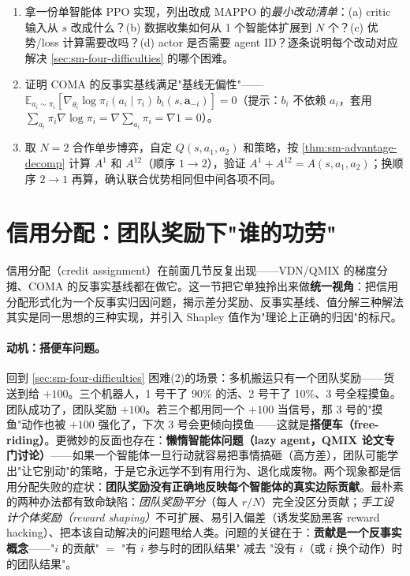 \begin{practice}
\begin{enumerate}
  \item 拿一份单智能体 PPO 实现，列出改成 MAPPO 的\emph{最小改动清单}：(a) critic 输入从 $s$ 改成什么？(b) 数据收集如何从 1 个智能体扩展到 $N$ 个？(c) 优势/loss 计算需要改吗？(d) actor 是否需要 agent ID？逐条说明每个改动对应解决 \cref{sec:sm-four-difficulties} 的哪个困难。
  \item 证明 COMA 的反事实基线满足"基线无偏性"——$\mathbb{E}_{a_i\sim\pi_i}[\nabla_{\theta_i}\log\pi_i(a_i\mid\tau_i)\,b_i(s,\mathbf{a}_{-i})]=0$（提示：$b_i$ 不依赖 $a_i$，套用 $\sum_{a_i}\pi_i\nabla\log\pi_i=\nabla\sum_{a_i}\pi_i=\nabla 1=0$）。
  \item 取 $N=2$ 合作单步博弈，自定 $Q(s,a_1,a_2)$ 和策略，按 \cref{thm:sm-advantage-decomp} 计算 $A^1$ 和 $A^{12}$（顺序 $1\to2$），验证 $A^1+A^{12}=A(s,a_1,a_2)$；换顺序 $2\to1$ 再算，确认联合优势相同但中间各项不同。
\end{enumerate}
\end{practice}

\section{信用分配：团队奖励下"谁的功劳"}
\label{sec:sm-credit}

信用分配（credit assignment）在前面几节反复出现——VDN/QMIX 的梯度分摊、COMA 的反事实基线都在做它。这一节把它单独拎出来做\textbf{统一视角}：把信用分配形式化为一个反事实归因问题，揭示差分奖励、反事实基线、值分解三种解法其实是同一思想的三种实现，并引入 Shapley 值作为"理论上正确的归因"的标尺。

\paragraph{动机：搭便车问题。}
回到 \cref{sec:sm-four-difficulties} 困难(2)的场景：多机搬运只有一个团队奖励——货送到给 $+100$。三个机器人，1 号干了 90\% 的活、2 号干了 10\%、3 号全程摸鱼。团队成功了，团队奖励 $+100$。若三个都用同一个 $+100$ 当信号，那 3 号的"摸鱼"动作也被 $+100$ 强化了，下次 3 号会更倾向摸鱼——这就是\textbf{搭便车（free-riding）}。更微妙的反面也存在：\textbf{懒惰智能体问题（lazy agent，QMIX 论文专门讨论\cite{rashid2018qmix}）}——如果一个智能体一旦行动就容易把事情搞砸（高方差），团队可能学出"让它别动"的策略，于是它永远学不到有用行为、退化成废物。两个现象都是信用分配失败的症状：\textbf{团队奖励没有正确地反映每个智能体的真实边际贡献}。最朴素的两种办法都有致命缺陷：\emph{团队奖励平分}（每人 $r/N$）完全没区分贡献；\emph{手工设计个体奖励（reward shaping）}不可扩展、易引入偏差（诱发奖励黑客 reward hacking）、把本该自动解决的问题甩给人类。问题的关键在于：\textbf{贡献是一个反事实概念}——"$i$ 的贡献" $=$ "有 $i$ 参与时的团队结果" 减去 "没有 $i$（或 $i$ 换个动作）时的团队结果"。

